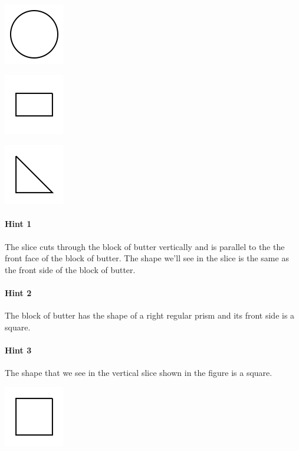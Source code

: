\documentclass[twocolumn,10pt]{article}
\def\shrinkfactor{0.4}
\begin{document}
 
\includegraphics[scale=\shrinkfactor]{figures/9bf34a29bc62816f07057d9e571de844df484cd9.png}


\includegraphics[scale=\shrinkfactor]{figures/0e5042b475e0847d67b74c0482f8e8173f798656.png}


\includegraphics[scale=\shrinkfactor]{figures/02361468f7d85874956214c7a0a119b84a8c2651.png}



\paragraph{Hint 1}The slice cuts through the block of butter vertically and is parallel to the the front face of the block of butter. The shape we'll see in the slice is the same as the front side of the block of butter.

\paragraph{Hint 2}The block of butter has the shape of a right regular prism and its front side is a square.

\paragraph{Hint 3}The shape that we see in the vertical slice shown in the figure is a square.  

\includegraphics[scale=\shrinkfactor]{figures/4b59a0ece6acc7c19c389e1de534d1df93bf1169.png}
\end{document}
